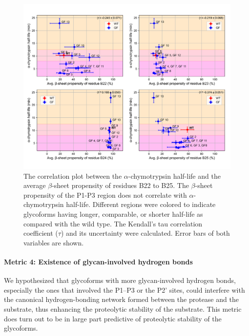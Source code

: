 \documentclass[9pt]{elife}
\begin{document}
\begin{figure}[H]
\centering
\includegraphics[width=\textwidth]{Figures/avg_beta_propensity_correlation.png}
\caption{The correlation plot between the $\alpha$-chymotrypsin half-life and the average $\beta$-sheet propensity of residues B22 to B25. The $\beta$-sheet propensity of the P1-P3 region does not correlate with $\alpha$-chymotrypsin half-life. Different regions were colored to indicate glycoforms having longer, comparable, or shorter half-life as compared with the wild type. The Kendall's tau correlation coefficient ($\tau$) and its uncertainty were calculated. Error bars of both variables are shown.}
\label{result_beta}
\end{figure}

\paragraph{Metric 4: Existence of glycan-involved hydrogen bonds}
We hypothesized that glycoforms with more glycan-involved hydrogen bonds, especially the ones that involved the P1--P3 or the P2' sites, could interfere with the canonical hydrogen-bonding network formed between the protease and the substrate, thus enhancing the proteolytic stability of the substrate. This metric does turn out to be in large part predictive of proteolytic stability of the glycoforms. 
\end{document}

